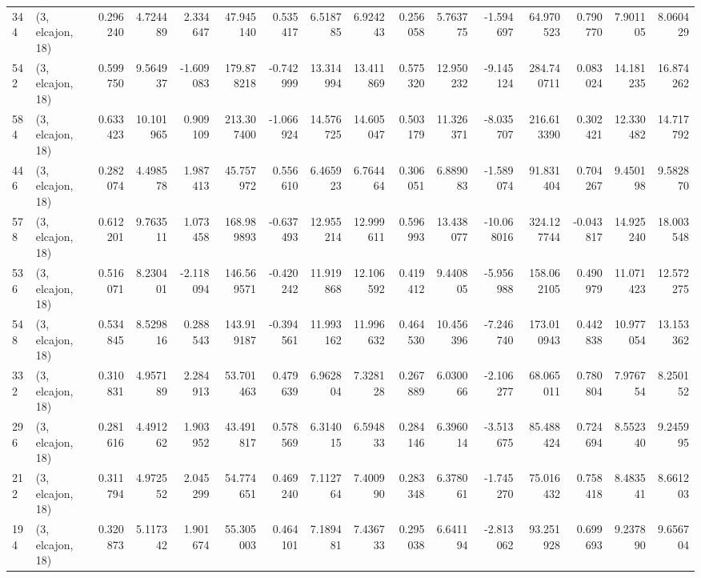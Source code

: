 \begin{tabular}{llrrrrrrrrrrrrrr}
344 &  (3, elcajon, 18) &   0.296240 &   4.724489 &   2.334647 &    47.945140 &   0.535417 &   6.518785 &   6.924243 &  0.256058 &   5.763775 &  -1.594697 &     64.970523 &   0.790770 &    7.901105 &    8.060429 \\
542 &  (3, elcajon, 18) &   0.599750 &   9.564937 &  -1.609083 &   179.878218 &  -0.742999 &  13.314994 &  13.411869 &  0.575320 &  12.950232 &  -9.145124 &    284.740711 &   0.083024 &   14.181235 &   16.874262 \\
584 &  (3, elcajon, 18) &   0.633423 &  10.101965 &   0.909109 &   213.307400 &  -1.066924 &  14.576725 &  14.605047 &  0.503179 &  11.326371 &  -8.035707 &    216.613390 &   0.302421 &   12.330482 &   14.717792 \\
446 &  (3, elcajon, 18) &   0.282074 &   4.498578 &   1.987413 &    45.757972 &   0.556610 &   6.465923 &   6.764464 &  0.306051 &   6.889083 &  -1.589074 &     91.831404 &   0.704267 &    9.450198 &    9.582870 \\
578 &  (3, elcajon, 18) &   0.612201 &   9.763511 &   1.073458 &   168.989893 &  -0.637493 &  12.955214 &  12.999611 &  0.596993 &  13.438077 & -10.068016 &    324.127744 &  -0.043817 &   14.925240 &   18.003548 \\
536 &  (3, elcajon, 18) &   0.516071 &   8.230401 &  -2.118094 &   146.569571 &  -0.420242 &  11.919868 &  12.106592 &  0.419412 &   9.440805 &  -5.956988 &    158.062105 &   0.490979 &   11.071423 &   12.572275 \\
548 &  (3, elcajon, 18) &   0.534845 &   8.529816 &   0.288543 &   143.919187 &  -0.394561 &  11.993162 &  11.996632 &  0.464530 &  10.456396 &  -7.246740 &    173.010943 &   0.442838 &   10.977054 &   13.153362 \\
332 &  (3, elcajon, 18) &   0.310831 &   4.957189 &   2.284913 &    53.701463 &   0.479639 &   6.962804 &   7.328128 &  0.267889 &   6.030066 &  -2.106277 &     68.065011 &   0.780804 &    7.976754 &    8.250152 \\
296 &  (3, elcajon, 18) &   0.281616 &   4.491262 &   1.903952 &    43.491817 &   0.578569 &   6.314015 &   6.594833 &  0.284146 &   6.396014 &  -3.513675 &     85.488424 &   0.724694 &    8.552340 &    9.245995 \\
212 &  (3, elcajon, 18) &   0.311794 &   4.972552 &   2.045299 &    54.774651 &   0.469240 &   7.112764 &   7.400990 &  0.283348 &   6.378061 &  -1.745270 &     75.016432 &   0.758418 &    8.483541 &    8.661203 \\
194 &  (3, elcajon, 18) &   0.320873 &   5.117342 &   1.901674 &    55.305003 &   0.464101 &   7.189481 &   7.436733 &  0.295038 &   6.641194 &  -2.813062 &     93.251928 &   0.699693 &    9.237890 &    9.656704 \\

\end{tabular}
